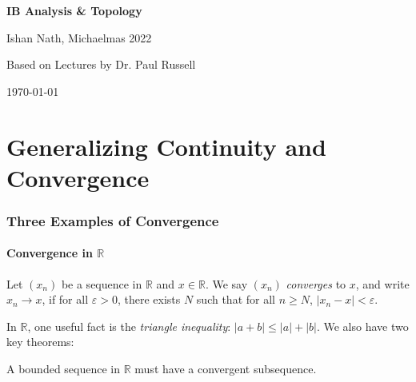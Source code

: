 \documentclass[12pt]{article}
\begin{document}
\hypersetup{pageanchor=false}
\begin{titlepage}
	\begin{center}
		\vspace*{1em}
		\Huge
		\textbf{IB Analysis \& Topology}

		\vspace{1em}
		\large
		Ishan Nath, Michaelmas 2022

		\vspace{1.5em}

		\Large

		Based on Lectures by Dr. Paul Russell

		\vspace{1em}

		\large
		\today
	\end{center}
	
\end{titlepage}
\hypersetup{pageanchor=true}

\tableofcontents

\newpage

\part{Generalizing Continuity and Convergence}%
\label{prt:generalizing_continuity_and_convergence}

\section{Three Examples of Convergence}%
\label{sec:three_examples_of_convergence}

\subsection{Convergence in \texorpdfstring{$\mathbb{R}$}{R}}%
\label{sub:convergence_in_r_}

Let $(x_n)$ be a sequence in $\mathbb{R}$ and $x \in \mathbb{R}$. We say $(x_n)$ \textit{converges} to $x$, and write $x_n \to x$, if for all $\varepsilon > 0$, there exists $N$ such that for all $n \geq N$, $|x_n - x| < \varepsilon$.

In $\mathbb{R}$, one useful fact is the \textit{triangle inequality}: $|a+b| \leq |a| + |b|$. We also have two key theorems:

\begin{theorem}
\item
	A bounded sequence in $\mathbb{R}$ must have a convergent subsequence.
\end{theorem}
\end{document}
